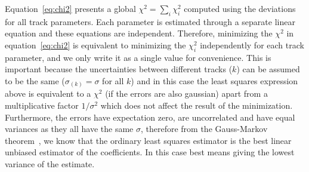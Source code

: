 \documentclass[10pt,a4paper]{article}
\begin{document}
Equation~\ref{eq:chi2} presents a global $\chi^2 = \sum_i \chi^2_i$ computed using the deviations for all track parameters. Each parameter is estimated through a separate linear equation and these equations are independent. Therefore, minimizing the $\chi^2$ in equation~\ref{eq:chi2} is equivalent to minimizing the $\chi^2_i$ independently for each track parameter, and we only write it as a single value for convenience. This is important because the uncertainties between different tracks ($k$) can be assumed to be the same ($\sigma_{(k)} = \sigma$ for all $k$) and in this case the least squares expression above is equivalent to a $\chi^2$ (if the errors are also gaussian) apart from a multiplicative factor $1/\sigma^2$ which does not affect the result of the minimization. Furthermore, the errors have expectation zero, are uncorrelated and have equal variances as they all have the same $\sigma$, therefore from the Gauss-Markov theorem~\cite{GaussMarkov}, we know that the ordinary least squares estimator is the best linear unbiased estimator of the coefficients. In this case best means giving the lowest variance of the estimate.
\end{document}
